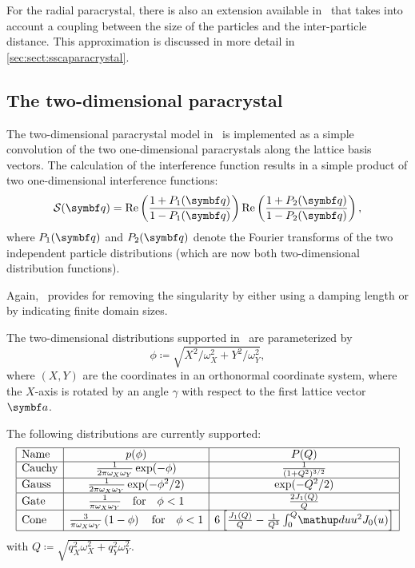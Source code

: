 For the radial paracrystal, there is also an extension available in \BornAgain\ that takes into account a coupling between the size of the particles and
the inter-particle distance. This approximation is discussed in more detail in \ref{sec:sect:sscaparacrystal}.

\subsection{The two-dimensional paracrystal} \label{sec:sect:2dparacrystal}
The two-dimensional paracrystal model in \BornAgain\ is implemented as a simple convolution of the two one-dimensional paracrystals along the
lattice basis vectors. The calculation of the interference function results in a simple product of two one-dimensional interference functions:
\begin{equation}
  \SD(\q) =  \Re\left(\frac{1+P_1(\q)}{1-P_1(\q)}\right) \Re\left(\frac{1+P_2(\q)}{1-P_2(\q)}\right),
\end{equation}
where $P_1(\q)$ and $P_2(\q)$ denote the Fourier transforms of the two independent particle distributions (which are now both two-dimensional
distribution functions).

Again, \BornAgain\ provides for removing the singularity by either using a damping length or by indicating finite domain sizes.

The two-dimensional distributions supported in \BornAgain\ are parameterized by
\begin{equation}
  \phi \coloneqq \sqrt{X^2/\omega_X^2 + Y^2/\omega_Y^2},
\end{equation}
where $(X,Y)$ are the coordinates in an orthonormal coordinate system, where the $X$-axis is rotated
by an angle $\gamma$ with respect to the first lattice vector $\v a$.

The following distributions are currently supported:
\begin{equation}
  \begin{array}{|l|c|c|}
    \hline
    \text{Name} & p(\phi) & P(Q) \\
    \hline
    \text{Cauchy} & \frac{1}{2\pi\omega_X\omega_Y} \exp(-\phi) & \frac{1}{(1+Q^2)^{3/2}} \\
    \hline
    \text{Gauss} & \frac{1}{2\pi\omega_X\omega_Y} \exp(-\phi^2/2)  & \exp(-Q^2/2) \\
    \hline
    \text{Gate} & \frac{1}{\pi\omega_X\omega_Y}  \quad \text{for} \quad \phi < 1 & \frac{2J_1(Q)}{Q} \\
    \hline
    \text{Cone} & \frac{3}{\pi\omega_X\omega_Y}\left(1 - \phi \right)  \quad \text{for} \quad \phi < 1 & 6\left[ \frac{J_1(Q)}{Q} - \frac{1}{Q^3}\int_0^Q\!\d u u^2 J_0(u) \right] \\
    \hline
  \end{array}
\end{equation}
with $Q \coloneqq \sqrt{q_X^2\omega_X^2 + q_Y^2\omega_Y^2}$.

